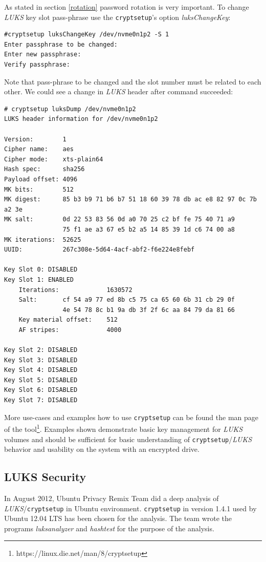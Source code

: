 As stated in section \ref{rotation} password rotation is very important.
To change {\it LUKS} key slot pass-phrase use the {\tt cryptsetup}'s option {\it luksChangeKey}:
\begin{lstlisting}[columns=fixed,basicstyle=\ttfamily\footnotesize,tabsize=4,backgroundcolor=\color{yellow!10}]
#cryptsetup luksChangeKey /dev/nvme0n1p2 -S 1
Enter passphrase to be changed:
Enter new passphrase:
Verify passphrase:
\end{lstlisting}
Note that pass-phrase to be changed and the slot number must be related to each other.
We could see a change in {\it LUKS} header after command succeeded:
\begin{lstlisting}[columns=fixed,basicstyle=\ttfamily\footnotesize,tabsize=4,backgroundcolor=\color{yellow!10}]
# cryptsetup luksDump /dev/nvme0n1p2
LUKS header information for /dev/nvme0n1p2

Version:		1
Cipher name:	aes
Cipher mode:	xts-plain64
Hash spec:		sha256
Payload offset:	4096
MK bits:		512
MK digest:		85 b3 b9 71 b6 b7 51 18 60 39 78 db ac e8 82 97 0c 7b a2 3e
MK salt:		0d 22 53 83 56 0d a0 70 25 c2 bf fe 75 40 71 a9
				75 f1 ae a3 67 e5 b2 a5 14 85 39 1d c6 74 00 a8
MK iterations: 	52625
UUID:			267c308e-5d64-4acf-abf2-f6e224e8febf

Key Slot 0: DISABLED
Key Slot 1: ENABLED
	Iterations:				1630572
	Salt:		cf 54 a9 77 ed 8b c5 75 ca 65 60 6b 31 cb 29 0f
				4e 54 78 8c b1 9a db 3f 2f 6c aa 84 79 da 81 66
	Key material offset:	512
	AF stripes:				4000

Key Slot 2: DISABLED
Key Slot 3: DISABLED
Key Slot 4: DISABLED
Key Slot 5: DISABLED
Key Slot 6: DISABLED
Key Slot 7: DISABLED
\end{lstlisting}
More use-cases and examples how to use {\tt cryptsetup} can be found the man page of the tool\footnote{https://linux.die.net/man/8/cryptsetup}.
Examples shown demonstrate basic key management for {\it LUKS} volumes and should be sufficient for basic understanding of {\tt cryptsetup}/{\it LUKS} behavior and usability on the system with an encrypted drive.



\subsection{LUKS Security}

In August 2012, Ubuntu Privacy Remix Team did a deep analysis of {\it LUKS}/{\tt cryptsetup} in Ubuntu environment.
{\tt cryptsetup} in version 1.4.1 used by Ubuntu 12.04 LTS has been chosen for the analysis.
The team wrote the programs {\it luksanalyzer} and {\it hashtest} for the purpose of the analysis.

